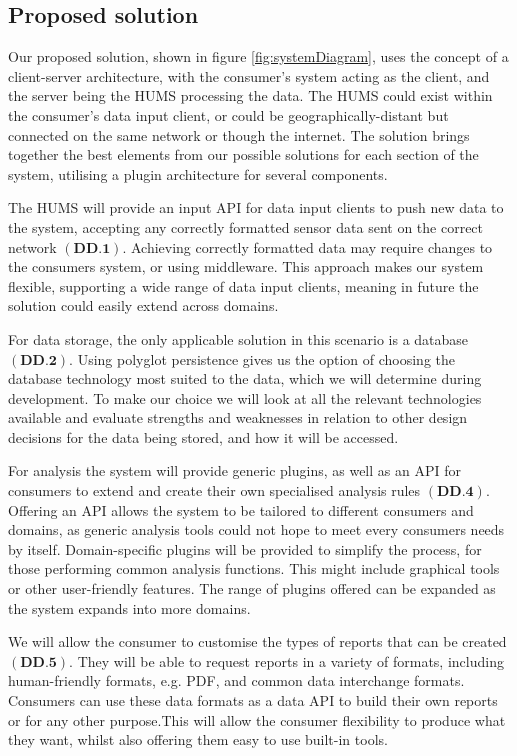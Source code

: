 \documentclass[10pt,a4paper]{article}
\begin{document}
\subsection{Proposed solution}
Our proposed solution, shown in figure \ref{fig:systemDiagram}, uses the 
concept of a client-server architecture, with the consumer's system acting 
as the client, and the server being the HUMS processing the data. 
The HUMS could exist within the consumer's data input client, or could be 
geographically-distant but connected on the same network or though the 
internet. The solution brings together the best elements from our
possible solutions for each section of the system, utilising a plugin
architecture for several components. 

The HUMS will provide an input API for data input clients to push new data to the
system, accepting any correctly formatted sensor data sent on the correct
network $(\textbf{DD.1})$. Achieving correctly formatted data may require changes
to the consumers system, or using middleware. This approach makes our system
flexible, supporting a wide range of data input clients, meaning in future the
solution could easily extend across domains. 

For data storage, the only applicable solution in this scenario is a database
$(\textbf{DD.2}).$ Using polyglot persistence gives us the option of choosing the
database technology most suited to the data, which we will determine
during development. To make our choice we will look at all the relevant
technologies available and evaluate strengths and weaknesses in relation to
other design decisions for the data being stored, and how it will be accessed. 

For analysis the system will provide generic plugins, as well as an API for
consumers to extend and create their own specialised analysis rules
 $(\textbf{DD.4})$. Offering an API allows the system to be tailored to different 
 consumers and domains, as generic analysis tools
could not hope to meet every consumers needs by itself.  Domain-specific plugins 
will be provided to simplify the process, for those performing common analysis
 functions. This might include graphical tools or other user-friendly features. 
 The range of plugins offered can be expanded as the system expands into 
 more domains. 

We will allow the consumer to customise the types of reports that can be 
created $(\textbf{DD.5})$. They will be able to request reports in a variety of 
formats, including human-friendly formats, e.g. PDF, and common data interchange
 formats. Consumers can use these data formats as a data API to build their own
reports or for any other purpose.This will allow the consumer flexibility to produce 
what they want, whilst also offering them easy to use built-in tools.
\end{document}

